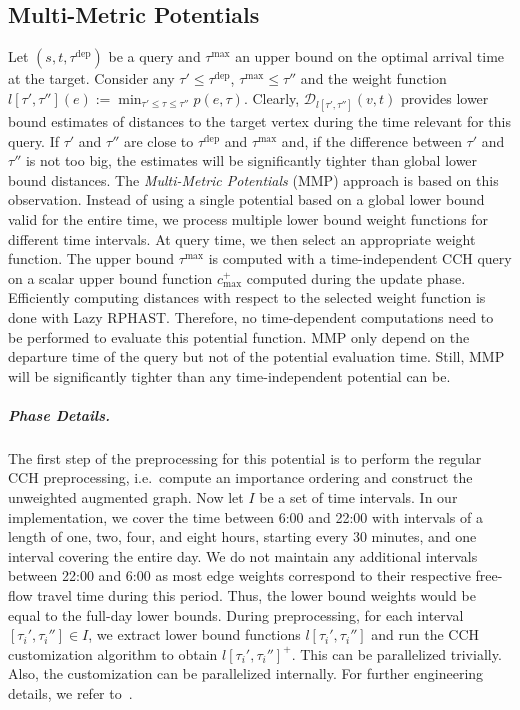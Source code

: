 \documentclass[a4paper,UKenglish,cleveref, autoref, thm-restate]{lipics-v2021}
\newcommand*{\pred}{p}
\newcommand*{\comb}{c}
\newcommand*{\dist}{\mathcal{D}}
\newcommand*{\tdep}{\tau^{\operatorname{dep}}}
\newcommand*{\tmax}{\tau^{\max}}
\begin{document}
\subsection{Multi-Metric Potentials}

Let $(s,t,\tdep)$ be a query and $\tmax$ an upper bound on the optimal arrival time at the target.
Consider any $\tau' \leq \tdep$, $\tmax \leq \tau''$ and the weight function $l[\tau', \tau''](e) := \min_{\tau' \leq \tau \leq \tau''}\pred(e, \tau)$. %
Clearly, $\dist_{l[\tau', \tau'']}(v,t)$ provides lower bound estimates of distances to the target vertex during the time relevant for this query.
If $\tau'$ and $\tau''$ are close to $\tdep$ and $\tmax$ and, if the difference between $\tau'$ and $\tau''$ is not too big, the estimates will be significantly tighter than global lower bound distances.
The \emph{Multi-Metric Potentials} (MMP) approach is based on this observation.
Instead of using a single potential based on a global lower bound valid for the entire time, we process multiple lower bound weight functions for different time intervals.
At query time, we then select an appropriate weight function.
The upper bound $\tmax$ is computed with a time-independent CCH query on a scalar upper bound function $\comb^+_{\max}$ computed during the update phase.
Efficiently computing distances with respect to the selected weight function is done with Lazy RPHAST.
Therefore, no time-dependent computations need to be performed to evaluate this potential function.
MMP only depend on the departure time of the query but not of the potential evaluation time.
Still, MMP will be significantly tighter than any time-independent potential can be.

\subparagraph{Phase Details.}
The first step of the preprocessing for this potential is to perform the regular CCH preprocessing, i.e.\ compute an importance ordering and construct the unweighted augmented graph.
Now let $I$ be a set of time intervals.
In our implementation,
we cover the time between 6:00 and 22:00 with intervals of a length of one, two, four, and eight hours, starting every 30 minutes,
and one interval covering the entire day.
We do not maintain any additional intervals between 22:00 and 6:00 as most edge weights correspond to their respective free-flow travel time during this period.
Thus, the lower bound weights would be equal to the full-day lower bounds.
During preprocessing, for each interval $[\tau_i', \tau_i''] \in I$, we extract lower bound functions $l[\tau_i', \tau_i'']$ and run the CCH customization algorithm to obtain $l[\tau_i', \tau_i'']^+$.
This can be parallelized trivially.
Also, the customization can be parallelized internally.
For further engineering details, we refer to~\cite{dsw-cch-15,bsw-rttau-19,ghuw-fbndocch-19}.
\end{document}
